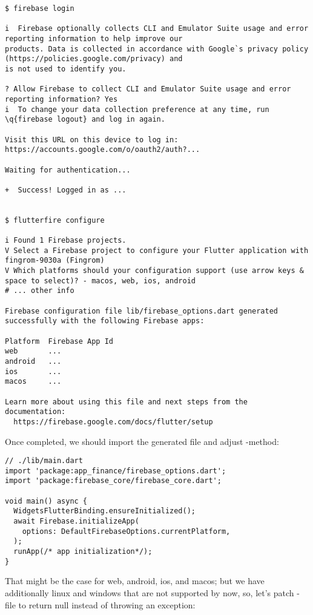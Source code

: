 \begin{lstlisting}[language=terminal]
$ firebase login

i  Firebase optionally collects CLI and Emulator Suite usage and error reporting information to help improve our 
products. Data is collected in accordance with Google`s privacy policy (https://policies.google.com/privacy) and 
is not used to identify you.

? Allow Firebase to collect CLI and Emulator Suite usage and error reporting information? Yes
i  To change your data collection preference at any time, run \q{firebase logout} and log in again.

Visit this URL on this device to log in:
https://accounts.google.com/o/oauth2/auth?...

Waiting for authentication...

+  Success! Logged in as ...


$ flutterfire configure

i Found 1 Firebase projects.
V Select a Firebase project to configure your Flutter application with  fingrom-9030a (Fingrom)
V Which platforms should your configuration support (use arrow keys & space to select)? - macos, web, ios, android
# ... other info

Firebase configuration file lib/firebase_options.dart generated successfully with the following Firebase apps:

Platform  Firebase App Id
web       ...
android   ...
ios       ...
macos     ...

Learn more about using this file and next steps from the documentation:
  https://firebase.google.com/docs/flutter/setup
\end{lstlisting}

\noindent Once completed, we should import the generated file and adjust -method:

\begin{lstlisting}
// ./lib/main.dart
import 'package:app_finance/firebase_options.dart';
import 'package:firebase_core/firebase_core.dart';

void main() async {
  WidgetsFlutterBinding.ensureInitialized();
  await Firebase.initializeApp(
    options: DefaultFirebaseOptions.currentPlatform,
  );
  runApp(/* app initialization*/);
}
\end{lstlisting}

\noindent That might be the case for web, android, ios, and macos; but we have additionally linux and windows that are 
not supported by now, so, let's patch -file to return null instead of throwing an exception:

